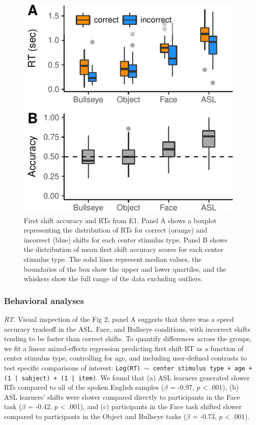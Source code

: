 \documentclass[10pt, letterpaper]{article}
\newenvironment{CodeChunk}{}{}
\begin{document}
\begin{CodeChunk}
\begin{figure}[t]

{\centering \includegraphics{figs/e1_acc_rt_plot-1} 

}

\caption[First shift accuracy and RTs from E1]{First shift accuracy and RTs from E1. Panel A shows a boxplot representing the distribution of RTs for correct (orange) and incorrect (blue) shifts for each center stimulus type. Panel B shows the distribution of mean first shift accuracy scores for each center stimulus type. The solid lines represent median values, the boundaries of the box show the upper and lower quartiles, and the whiskers show the full range of the data excluding outliers.}\label{fig:e1_acc_rt_plot}
\end{figure}
\end{CodeChunk}

\subsubsection{Behavioral analyses}\label{behavioral-analyses}

\emph{RT.} Visual inspection of the Fig 2, panel A suggests that there
was a speed accuracy tradeoff in the ASL, Face, and Bullseye conditions,
with incorrect shifts tending to be faster than correct shifts. To
quantify differences across the groups, we fit a linear mixed-effects
regression predicting first shift RT as a function of center stimulus
type, controlling for age, and including user-defined contrasts to test
specific comparisons of interest:
\texttt{Log(RT) $\sim$ center stimulus type + age +  (1 | subject) + (1 | item)}.
We found that (a) ASL learners generated slower RTs compared to all of
the spoken English samples (\(\beta\) = -0.97, \(p\) \textless{} .001),
(b) ASL learners' shifts were slower compared directly to participants
in the Face task (\(\beta\) = -0.42, \(p\) \textless{} .001), and (c)
participants in the Face task shifted slower compared to participants in
the Object and Bullseye tasks (\(\beta\) = -0.73, \(p\) \textless{}
.001).
\end{document}
